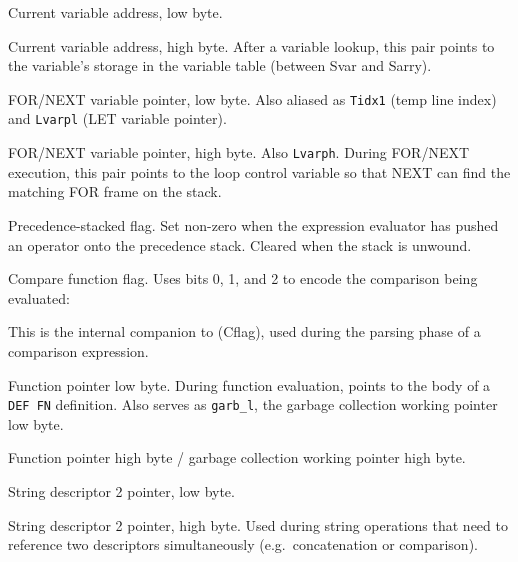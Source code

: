 
Current variable address, low byte.


Current variable address, high byte.  After a variable lookup, this pair
points to the variable's storage in the variable table (between Svar and
Sarry).


FOR/NEXT variable pointer, low byte.  Also aliased as \texttt{Tidx1} (temp
line index) and \texttt{Lvarpl} (LET variable pointer).


FOR/NEXT variable pointer, high byte.  Also \texttt{Lvarph}.  During FOR/NEXT
execution, this pair points to the loop control variable so that NEXT can
find the matching FOR frame on the stack.


Precedence-stacked flag.  Set non-zero when the expression evaluator has
pushed an operator onto the precedence stack.  Cleared when the stack is
unwound.


Compare function flag.  Uses bits 0, 1, and 2 to encode the comparison
being evaluated:

\bitfield{---}{---}{---}{---}{---}{\textgreater}{=}{\textless}

This is the internal companion to  (Cflag), used during the
parsing phase of a comparison expression.


Function pointer low byte.  During function evaluation, points to the body of
a \texttt{DEF FN} definition.  Also serves as \texttt{garb\_l}, the garbage
collection working pointer low byte.


Function pointer high byte / garbage collection working pointer high byte.


String descriptor 2 pointer, low byte.


String descriptor 2 pointer, high byte.  Used during string operations that
need to reference two descriptors simultaneously (e.g.\ concatenation or
comparison).

